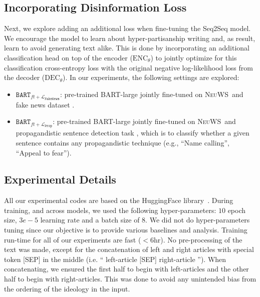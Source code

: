 \documentclass[11pt,a4paper]{article}
\newcommand{\ourdata}{{\scshape NeuWS}}
\newcommand{\prop}{$\texttt{BART}_{ft+\mathcal{L}_\texttt{Prop}}$}
\newcommand{\fakenews}{$\texttt{BART}_{ft+\mathcal{L}_\texttt{FakeNews}}$}
\begin{document}
\subsection{Incorporating Disinformation Loss}
Next, we explore adding an additional loss when fine-tuning the Seq2Seq model. 
We encourage the model to learn about hyper-partisanship writing and, as result, learn to avoid generating text alike.
This is done by incorporating an additional classification head on top of the encoder ($\mathrm{ENC}_{\theta}$) to jointly optimize for this classification cross-entropy loss with the original negative log-likelihood loss from the decoder ($\mathrm{DEC}_{\theta}$). 
In our experiments, the following settings are explored:
\begin{itemize}
    \item \fakenews: pre-trained BART-large jointly fine-tuned on \ourdata~and fake news dataset \cite{potthast2017stylometric}.
    \item \prop: pre-trained BART-large jointly fine-tuned on \ourdata~and propagandistic sentence detection task \cite{da2019fine}, which is to classify whether a given sentence contains any propagandistic technique (e.g., ``Name calling'', ``Appeal to fear'').
\end{itemize}

\subsection{Experimental Details}
All our experimental codes are based on the HuggingFace library~\cite{wolf-etal-2020-transformers}. During training, and across models, we used the following hyper-parameters: $10$ epoch size, $3e-5$ learning rate and a batch size of $8$. We did not do hyper-parameters tuning since our objective is to provide various baselines and analysis. Training run-time for all of our experiments are fast ($<6$hr). 
No pre-processing of the text was made, except for the concatenation of left and right articles with special token [SEP] in the middle (i.e. `` left-article [SEP] right-article ''). When concatenating, we ensured the first half to begin with left-articles and the other half to begin with right-articles. This was done to avoid any unintended bias from the ordering of the ideology in the input. 
\end{document}
